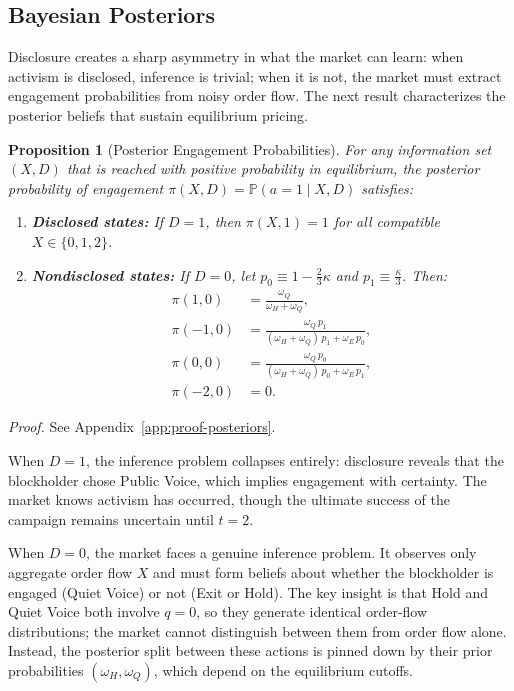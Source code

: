 \documentclass[11pt]{article}
\newtheorem{proposition}{Proposition}
\newcommand{\PP}{\mathbb{P}}
\newcommand{\1}{\mathbf{1}}
\begin{document}
%
\subsection{Bayesian Posteriors}
%

Disclosure creates a sharp asymmetry in what the market can learn: when activism is disclosed, inference is trivial; when it is not, the market must extract engagement probabilities from noisy order flow. The next result characterizes the posterior beliefs that sustain equilibrium pricing.

\begin{proposition}[Posterior Engagement Probabilities]
\label{prop:posteriors}
For any information set $(X,D)$ that is reached with positive probability in equilibrium, the posterior probability of engagement $\pi(X,D) = \PP(a=1 \mid X, D)$ satisfies:
\begin{enumerate}[label=(\alph*)]
\item \textbf{Disclosed states:} If $D = 1$, then $\pi(X, 1) = 1$ for all compatible $X \in \{0, 1, 2\}$.
\item \textbf{Nondisclosed states:} If $D = 0$, let $p_0 \equiv 1 - \frac{2}{3}\kappa$ and $p_1 \equiv \frac{\kappa}{3}$. Then:
\begin{align*}
\pi(1, 0) &= \frac{\omega_Q}{\omega_H + \omega_Q}, \\
\pi(-1, 0) &= \frac{\omega_Q \, p_1}{(\omega_H + \omega_Q) \, p_1 + \omega_E \, p_0}, \\
\pi(0, 0) &= \frac{\omega_Q \, p_0}{(\omega_H + \omega_Q) \, p_0 + \omega_E \, p_1}, \\
\pi(-2, 0) &= 0.
\end{align*}
\end{enumerate}
\end{proposition}
\textit{Proof.} See Appendix~\ref{app:proof-posteriors}.

When $D=1$, the inference problem collapses entirely: disclosure reveals that the blockholder chose Public Voice, which implies engagement with certainty. The market knows activism has occurred, though the ultimate success of the campaign remains uncertain until $t=2$.

When $D=0$, the market faces a genuine inference problem. It observes only aggregate order flow $X$ and must form beliefs about whether the blockholder is engaged (Quiet Voice) or not (Exit or Hold). The key insight is that Hold and Quiet Voice both involve $q=0$, so they generate identical order-flow distributions; the market cannot distinguish between them from order flow alone. Instead, the posterior split between these actions is pinned down by their prior probabilities $(\omega_H,\omega_Q)$, which depend on the equilibrium cutoffs.
\end{document}
